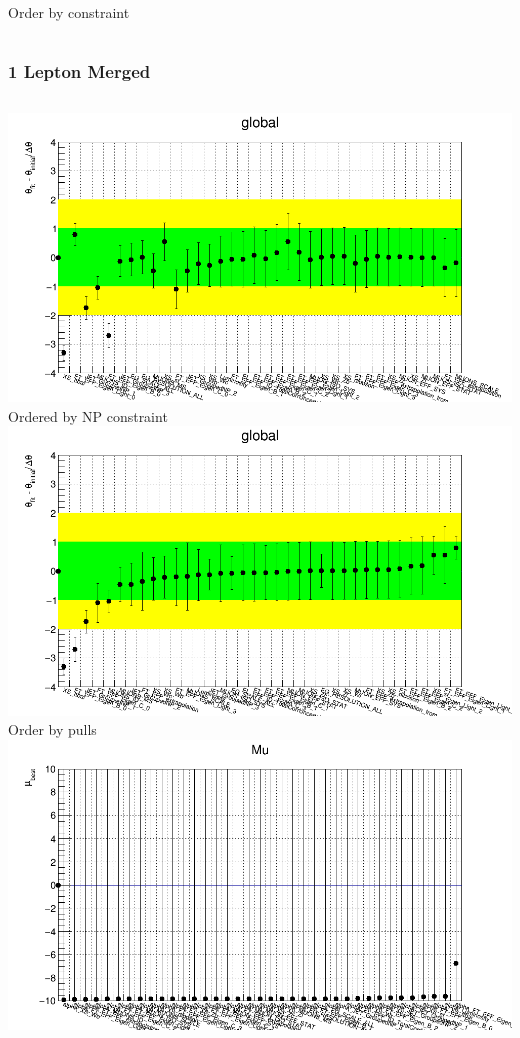 \documentclass{beamer}
\begin{document}
\begin{frame}
\begin{columns}[t]
\tiny{ Order by constraint }\\
\end{columns}
\end{frame}

\begin{frame}
\frametitle{1 Lepton Merged}
\begin{columns}[t]
\centering
\includegraphics[width=0.8\linewidth]{pics/pull_1lep_merge_order_constraint.png}\\
\tiny{ Ordered by NP constraint }\\
\includegraphics[width=0.8\linewidth]{pics/pull_1lep_merge_order_pull.png}\\
\tiny{ Order by pulls  }\\
\centering
\includegraphics[width=0.8\linewidth]{pics/mu_1lep_merge_order_pull.png}\\

\end{columns}
\end{frame}
\end{document}
